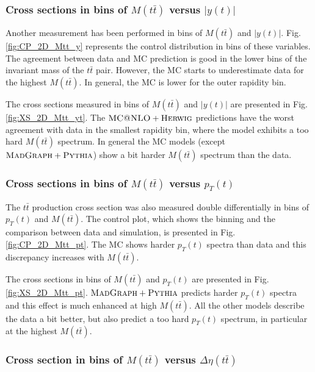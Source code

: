 
\subsubsection{Cross sections in bins of $M(t\bar{t})$ versus $|y(t)|$}

Another measurement has been performed in bins of $M(t\bar{t})$ and $|y(t)|$. Fig. \ref{fig:CP_2D_Mtt_y} represents the control distribution in bins of these variables.
The agreement between data and MC prediction is good in the lower bins of the invariant mass of the $t\bar{t}$ pair. 
However, the MC starts to underestimate data for the highest $M(t\bar{t})$. In general, the MC is lower for the outer rapidity 
bin. 

The cross sections measured in bins of $M(t\bar{t})$ and $|y(t)|$ are presented in Fig. \ref{fig:XS_2D_Mtt_yt}. The $\textsc{MC@NLO}+\textsc{Herwig}$ 
predictions have the worst agreement with data in the smallest rapidity bin, where the model exhibits a too hard $M(t\bar{t})$ spectrum.
In general the MC models (except $\textsc{MadGraph} + \textsc{Pythia}$) show a bit harder $M(t\bar{t})$ spectrum than the data.


\subsubsection{Cross sections in bins of $M(t\bar{t})$ versus $p_{T}(t)$}

The $t\bar{t}$ production cross section was also measured double differentially in bins of $p_{T}(t)$ and $M(t\bar{t})$.
The control plot, which shows the binning and the comparison between data and simulation, is presented in Fig. \ref{fig:CP_2D_Mtt_pt}. 
The MC shows harder $p_{T}(t)$ spectra than data and this discrepancy increases with $M(t\bar{t})$.

The cross sections in bins of $M(t\bar{t})$ and $p_{T}(t)$ are presented in Fig. \ref{fig:XS_2D_Mtt_pt}. $\textsc{MadGraph}+\textsc{Pythia}$ predicts harder
$p_{T}(t)$ spectra and this effect is much enhanced at high $M(t\bar{t})$. All the other models describe the data a bit better, but 
also predict a too hard $p_{T}(t)$ spectrum, in particular at the highest $M(t\bar{t})$.

\subsubsection{Cross section in bins of $M(t\bar{t})$ versus $\Delta\eta(t\bar{t})$}


